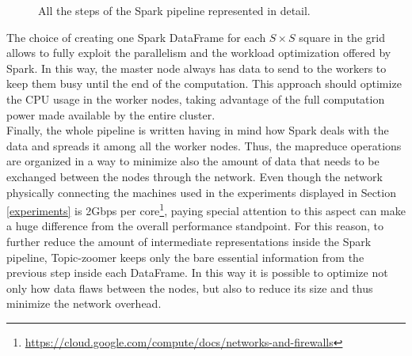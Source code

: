 \documentclass{sig-alternate-05-2015}
\begin{document}
\begin{figure}
  \caption{All the steps of the Spark pipeline represented in detail.}
  \label{spark_pipeline}
\end{figure}

The choice of creating one Spark DataFrame for each $S \times S$ square in the grid allows to fully exploit the parallelism and the workload optimization offered by Spark. In this way, the master node always has data to send to the workers to keep them busy until the end of the computation. This approach should optimize the CPU usage in the worker nodes, taking advantage of the full computation power made available by the entire cluster.\\
Finally, the whole pipeline is written having in mind how Spark deals with the data and spreads it among all the worker nodes. Thus, the map\-reduce operations are organized in a way to minimize also the amount of data that needs to be exchanged between the nodes through the network. Even though the network physically connecting the machines used in the experiments displayed in Section \ref{experiments} is 2Gbps per core\footnote{\url{https://cloud.google.com/compute/docs/networks-and-firewalls}}, paying special attention to this aspect can make a huge difference from the overall performance standpoint. For this reason, to further reduce the amount of intermediate representations inside the Spark pipeline, Topic-zoomer keeps only the bare essential information from the previous step inside each DataFrame. In this way it is possible to optimize not only how data flaws between the nodes, but also to reduce its size and thus minimize the network overhead.
\end{document}
